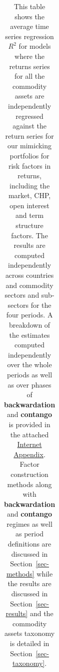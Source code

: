 \documentclass[
  authoryear,
  preprint,
  3p]{elsarticle}
\begin{document}
\begin{longtable}[t]{>{}l>{}l>{}l>{}l>{}r>{}r>{}r>{}r}

\caption{\label{tbl-regressions-factors}This table shows the average
time series regression \(R^{2}\) for models where the returns series for
all the commodity assets are independently regressed against the return
series for our mimicking portfolios for risk factors in returns,
including the market, CHP, open interest and term structure factors. The
results are computed independently across countries and commodity
sectors and sub-sectors for the four periods. A breakdown of the
estimates computed independently over the whole periods as well as over
phases of \textbf{backwardation} and \textbf{contango} is provided in
the attached \href{https://bautheac.shinyapps.io/co-movement/}{Internet
Appendix}. Factor construction methods along with \textbf{backwardation}
and \textbf{contango} regimes as well as period definitions are
discussed in Section~\ref{sec-methods} while the results are discussed
in Section~\ref{sec-results} and the commodity assets taxonomy is
detailed in Section~\ref{sec-taxonomy}.}

\tabularnewline


\end{longtable}
\end{document}
